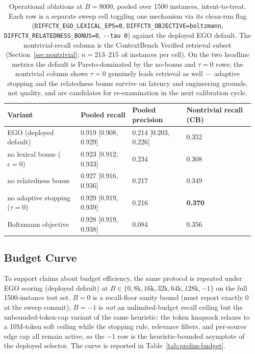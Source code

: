 \documentclass[11pt, a4paper]{article}
\begin{document}
\begin{table}[h]
\centering
\small
\caption{Operational ablations at $B{=}8000$, pooled over 1500 instances, intent-to-treat. Each row is a separate sweep cell toggling one mechanism via its clean-run flag (\texttt{DIFFCTX\_EGO\_LEXICAL\_EPS=0}, \texttt{DIFFCTX\_OBJECTIVE=boltzmann}, \texttt{DIFFCTX\_RELATEDNESS\_BONUS=0}, \texttt{-{}-tau 0}) against the deployed EGO default. The nontrivial-recall column is the ContextBench Verified retrieval subset (Section~\ref{sec:nontrivial}; $n{=}213$--$215$ \emph{ok} instances per cell). On the two headline metrics the default is Pareto-dominated by the no-bonus and $\tau{=}0$ rows; the nontrivial column shows $\tau{=}0$ genuinely leads retrieval as well --- adaptive stopping and the relatedness bonus survive on latency and engineering grounds, not quality, and are candidates for re-examination in the next calibration cycle.}
\label{tab:operational-ablation}
\begin{tabular}{llll}
\toprule
\textbf{Variant} & \textbf{Pooled recall} & \textbf{Pooled precision} & \textbf{Nontrivial recall (CB)} \\
\midrule
EGO (deployed default)            & 0.919 [0.908, 0.929] & 0.214 [0.203, 0.226] & 0.352 \\
\quad no lexical bonus ($\epsilon{=}0$) & 0.923 [0.912, 0.933] & 0.234 & 0.308 \\
\quad no relatedness bonus        & 0.927 [0.916, 0.936] & 0.217 & 0.349 \\
\quad no adaptive stopping ($\tau{=}0$) & 0.929 [0.919, 0.939] & 0.216 & \textbf{0.370} \\
\quad Boltzmann objective         & 0.928 [0.919, 0.938] & 0.084 & 0.356 \\
\bottomrule
\end{tabular}
\end{table}

\subsection{Budget Curve}
\label{sec:prelim-budget}

To support claims about budget efficiency, the same protocol is repeated under EGO scoring (deployed default) at $B \in \{0, 8\mathrm{k}, 16\mathrm{k}, 32\mathrm{k}, 64\mathrm{k}, 128\mathrm{k}, -1\}$ on the full 1500-instance test set. $B{=}0$ is a recall-floor sanity bound (must report exactly $0$ at the sweep commit); $B{=}{-1}$ is \emph{not} an unlimited-budget recall ceiling but the unbounded-token-cap variant of the same heuristic: the token knapsack relaxes to a 10M-token soft ceiling while the stopping rule, relevance filters, and per-source edge cap all remain active, so the $-1$ row is the heuristic-bounded asymptote of the deployed selector. The curve is reported in Table~\ref{tab:prelim-budget}.
\end{document}
